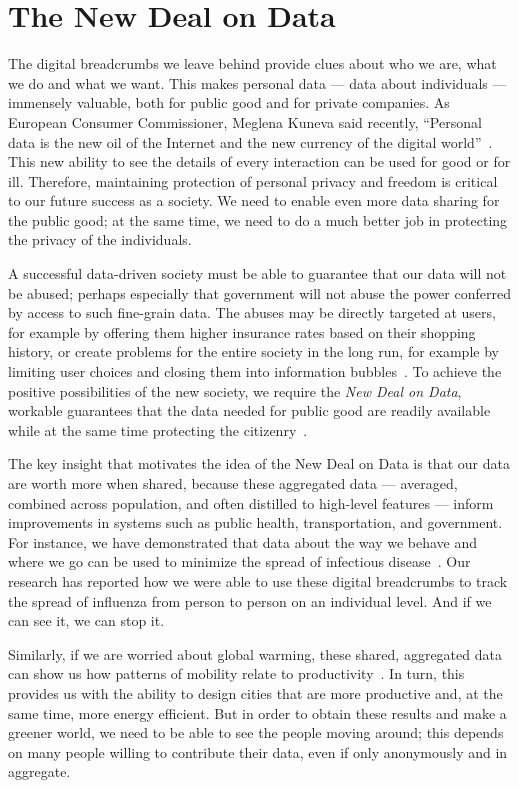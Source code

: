 \section{The New Deal on Data }

The digital breadcrumbs we leave behind provide clues about who we are, what we do and what we want.
This makes personal data --- data about individuals --- immensely valuable, both for public good and for private companies.
As European Consumer Commissioner, Meglena Kuneva said recently, ``Personal data is the new oil of the Internet and the new currency of the digital world''~\cite{kuneva2009}.
This new ability to see the details of every interaction can be used for good or for ill.
Therefore, maintaining protection of personal privacy and freedom is critical to our future success as a society.
We need to enable even more data sharing for the public good; at the same time, we need to do a much better job in protecting the privacy of the individuals.

A successful data-driven society must be able to guarantee that our data will not be abused; perhaps especially that government will not abuse the power conferred by access to such fine-grain data.
The abuses may be directly targeted at users, for example by offering them higher insurance rates based on their shopping history, or create problems for the entire society in the long run, for example by limiting user choices and closing them into information bubbles~\cite{hannak2013measuring}. 
To achieve the positive possibilities of the new society, we require the \emph{New Deal on Data}, workable guarantees that the data needed for public good are readily available while at the same time protecting the citizenry~\cite{pentland2009reality}.

The key insight that motivates the idea of the New Deal on Data is that our data are worth more when shared, because these aggregated data --- averaged, combined across population, and often distilled to high-level features --- inform improvements in systems such as public health, transportation, and government.
For instance, we have demonstrated that data about the way we behave and where we go can be used to minimize the spread of infectious disease~\cite{madan2010social, pentland2009using}.
Our research has reported how we were able to use these digital breadcrumbs to track the spread of influenza from person to person on an individual level.
And if we can see it, we can stop it.

Similarly, if we are worried about global warming, these shared, aggregated data can show us how patterns of mobility relate to productivity~\cite{pan2013urban}.
In turn, this provides us with the ability to design cities that are more productive and, at the same time, more energy efficient.
But in order to obtain these results and make a greener world, we need to be able to see the people moving around; this depends on many people willing to contribute their data, even if only anonymously and in aggregate.

